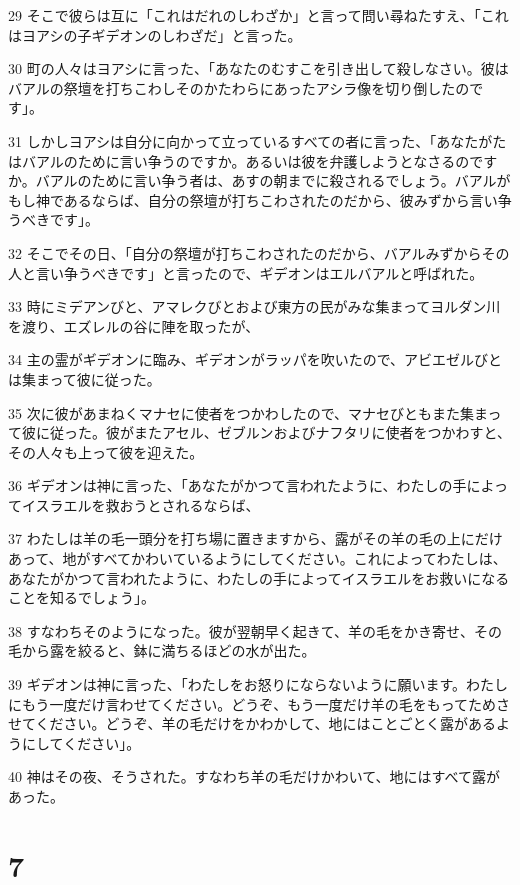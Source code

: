 \par 29 そこで彼らは互に「これはだれのしわざか」と言って問い尋ねたすえ、「これはヨアシの子ギデオンのしわざだ」と言った。
\par 30 町の人々はヨアシに言った、「あなたのむすこを引き出して殺しなさい。彼はバアルの祭壇を打ちこわしそのかたわらにあったアシラ像を切り倒したのです」。
\par 31 しかしヨアシは自分に向かって立っているすべての者に言った、「あなたがたはバアルのために言い争うのですか。あるいは彼を弁護しようとなさるのですか。バアルのために言い争う者は、あすの朝までに殺されるでしょう。バアルがもし神であるならば、自分の祭壇が打ちこわされたのだから、彼みずから言い争うべきです」。
\par 32 そこでその日、「自分の祭壇が打ちこわされたのだから、バアルみずからその人と言い争うべきです」と言ったので、ギデオンはエルバアルと呼ばれた。
\par 33 時にミデアンびと、アマレクびとおよび東方の民がみな集まってヨルダン川を渡り、エズレルの谷に陣を取ったが、
\par 34 主の霊がギデオンに臨み、ギデオンがラッパを吹いたので、アビエゼルびとは集まって彼に従った。
\par 35 次に彼があまねくマナセに使者をつかわしたので、マナセびともまた集まって彼に従った。彼がまたアセル、ゼブルンおよびナフタリに使者をつかわすと、その人々も上って彼を迎えた。
\par 36 ギデオンは神に言った、「あなたがかつて言われたように、わたしの手によってイスラエルを救おうとされるならば、
\par 37 わたしは羊の毛一頭分を打ち場に置きますから、露がその羊の毛の上にだけあって、地がすべてかわいているようにしてください。これによってわたしは、あなたがかつて言われたように、わたしの手によってイスラエルをお救いになることを知るでしょう」。
\par 38 すなわちそのようになった。彼が翌朝早く起きて、羊の毛をかき寄せ、その毛から露を絞ると、鉢に満ちるほどの水が出た。
\par 39 ギデオンは神に言った、「わたしをお怒りにならないように願います。わたしにもう一度だけ言わせてください。どうぞ、もう一度だけ羊の毛をもってためさせてください。どうぞ、羊の毛だけをかわかして、地にはことごとく露があるようにしてください」。
\par 40 神はその夜、そうされた。すなわち羊の毛だけかわいて、地にはすべて露があった。

\chapter{7}

